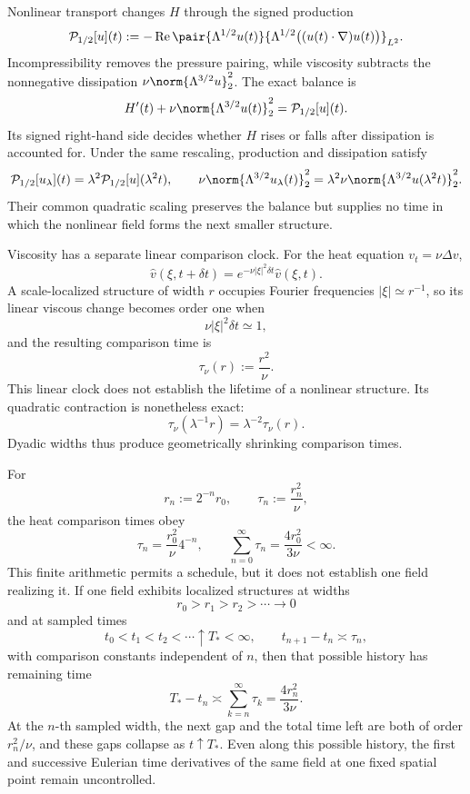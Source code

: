 
Nonlinear transport changes \(H\) through the signed production
\[
  \mathcal P_{1/2}[u](t)
  :=
  -\operatorname{Re}
  \pair
    {\Lambda^{1/2}u(t)}
    {\Lambda^{1/2}\bigl((u(t)\cdot\nabla)u(t)\bigr)}_{L^2}.
\]
Incompressibility removes the pressure pairing, while viscosity subtracts the nonnegative dissipation \(\nu\norm{\Lambda^{3/2}u}_2^2\).
The exact balance is
\[
  H'(t)
  +
  \nu\norm{\Lambda^{3/2}u(t)}_2^2
  =
  \mathcal P_{1/2}[u](t).
\]
Its signed right-hand side decides whether \(H\) rises or falls after dissipation is accounted for.
Under the same rescaling, production and dissipation satisfy
\[
  \mathcal P_{1/2}[u_\lambda](t)
  =
  \lambda^2\mathcal P_{1/2}[u](\lambda^2t),
  \qquad
  \nu\norm{\Lambda^{3/2}u_\lambda(t)}_2^2
  =
  \lambda^2\nu\norm{\Lambda^{3/2}u(\lambda^2t)}_2^2.
\]
Their common quadratic scaling preserves the balance but supplies no time in which the nonlinear field forms the next smaller structure.


Viscosity has a separate linear comparison clock.
For the heat equation \(v_t=\nu\Delta v\),
\[
  \widehat v(\xi,t+\delta t)
  =
  e^{-\nu|\xi|^2\delta t}\widehat v(\xi,t).
\]
A scale-localized structure of width \(r\) occupies Fourier frequencies \(|\xi|\simeq r^{-1}\), so its linear viscous change becomes order one when
\[
  \nu|\xi|^2\delta t\simeq1,
\]
and the resulting comparison time is
\[
  \tau_\nu(r)
  :=
  \frac{r^2}{\nu}.
\]
This linear clock does not establish the lifetime of a nonlinear structure.
Its quadratic contraction is nonetheless exact:
\[
  \tau_\nu(\lambda^{-1}r)
  =
  \lambda^{-2}\tau_\nu(r).
\]
Dyadic widths thus produce geometrically shrinking comparison times.


For
\[
  r_n:=2^{-n}r_0,
  \qquad
  \tau_n:=\frac{r_n^2}{\nu},
\]
the heat comparison times obey
\[
  \tau_n
  =
  \frac{r_0^2}{\nu}4^{-n},
  \qquad
  \sum_{n=0}^{\infty}\tau_n
  =
  \frac{4r_0^2}{3\nu}
  <
  \infty.
\]
This finite arithmetic permits a schedule, but it does not establish one field realizing it.
If one \NavierStokes{} field exhibits localized structures at widths
\[
  r_0>r_1>r_2>\cdots\longrightarrow0
\]
and at sampled times
\[
  t_0<t_1<t_2<\cdots\uparrow T_*<\infty,
  \qquad
  t_{n+1}-t_n\asymp\tau_n,
\]
with comparison constants independent of \(n\), then that possible history has remaining time
\[
  T_*-t_n
  \asymp
  \sum_{k=n}^{\infty}\tau_k
  =
  \frac{4r_n^2}{3\nu}.
\]
At the \(n\)-th sampled width, the next gap and the total time left are both of order \(r_n^2/\nu\), and these gaps collapse as \(t\uparrow T_*\).
Even along this possible history, the first and successive Eulerian time derivatives of the same field at one fixed spatial point remain uncontrolled.
